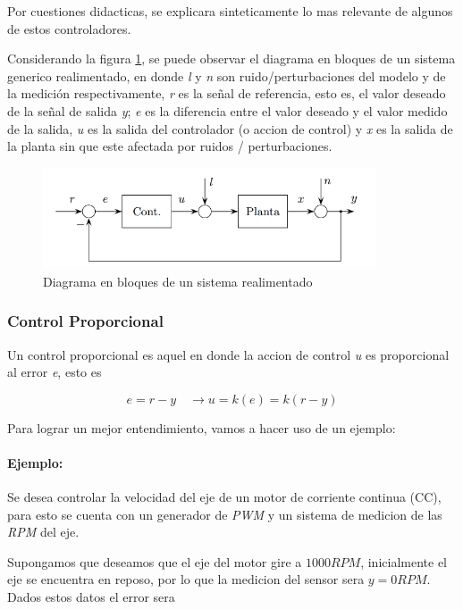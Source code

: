 \documentclass[10pt,conference,a4paper,onecolumn]{article}%
\begin{document}
Por cuestiones didacticas, se explicara sinteticamente lo mas relevante de algunos de estos controladores.%


Considerando la figura \ref{fig:sis_generico}, se puede observar el diagrama en bloques de un sistema generico realimentado, en donde \textit{l} y \textit{n} son ruido/perturbaciones del modelo y de la medición respectivamente,   \textit{r} es la señal de referencia, esto es, el valor deseado de la señal de salida \textit{y}; \textit{e} es la diferencia entre el valor deseado y el valor medido de la salida,    \textit{u} es la salida del controlador (o accion de control) y  \textit{x} es la salida de la planta sin que este afectada por ruidos / perturbaciones.

\begin{figure}[h]
\centering
\includegraphics[height=3cm]{./imagenes/sis_realim_generico.png}
\caption{Diagrama en bloques de un sistema realimentado}
\label{fig:sis_generico}
\end{figure}


\subsubsection{Control Proporcional}
Un control proporcional es aquel en donde la accion de control \textit{u} es proporcional al error \textit{e}, esto es

\begin{equation}
e=r-y \quad \rightarrow u=k(e)=k (r-y)
\end{equation}

Para lograr un mejor entendimiento, vamos a hacer uso de un ejemplo:
\paragraph{Ejemplo:} Se desea controlar la velocidad del eje de un motor de corriente continua (CC), para esto se cuenta con un generador de \textit{PWM} y un sistema de medicion de las \textit{RPM} del eje.

Supongamos que deseamos que el eje del motor gire a $1000RPM$, inicialmente el eje se encuentra en reposo, por lo que la medicion del sensor sera $y=0RPM$. Dados estos datos el error sera
\end{document}
